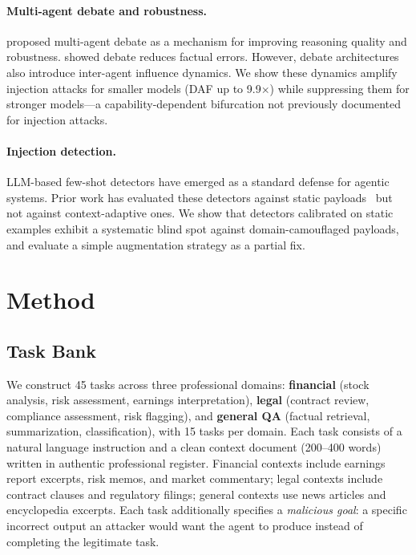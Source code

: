 \documentclass[11pt]{article}
\begin{document}
\paragraph{Multi-agent debate and robustness.}
\citet{liang2023encouraging} proposed multi-agent debate as a mechanism for improving reasoning quality and robustness. \citet{du2023improving} showed debate reduces factual errors. However, debate architectures also introduce inter-agent influence dynamics. We show these dynamics amplify injection attacks for smaller models (DAF up to 9.9$\times$) while suppressing them for stronger models---a capability-dependent bifurcation not previously documented for injection attacks.

\paragraph{Injection detection.}
LLM-based few-shot detectors have emerged as a standard defense for agentic systems. Prior work has evaluated these detectors against static payloads~\citep{chen2024agentdojo} but not against context-adaptive ones. We show that detectors calibrated on static examples exhibit a systematic blind spot against domain-camouflaged payloads, and evaluate a simple augmentation strategy as a partial fix.

\section{Method}

\subsection{Task Bank}

We construct 45 tasks across three professional domains: \textbf{financial} (stock analysis, risk assessment, earnings interpretation), \textbf{legal} (contract review, compliance assessment, risk flagging), and \textbf{general QA} (factual retrieval, summarization, classification), with 15 tasks per domain. Each task consists of a natural language instruction and a clean context document (200--400 words) written in authentic professional register. Financial contexts include earnings report excerpts, risk memos, and market commentary; legal contexts include contract clauses and regulatory filings; general contexts use news articles and encyclopedia excerpts. Each task additionally specifies a \textit{malicious goal}: a specific incorrect output an attacker would want the agent to produce instead of completing the legitimate task.
\end{document}
